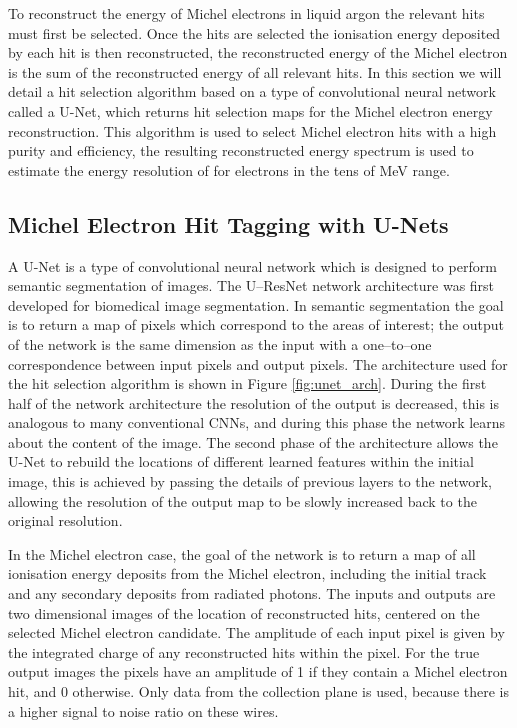 To reconstruct the energy of Michel electrons in liquid argon the relevant hits
must first be selected. Once the hits are selected the ionisation energy
deposited by each hit is then reconstructed, the reconstructed energy of the 
Michel electron is the sum of the reconstructed energy of all relevant hits. In
this section we will detail a hit selection algorithm based on a type of
convolutional neural network called a U-Net, which returns hit selection maps 
for the Michel electron energy reconstruction. This algorithm is used to select 
Michel electron hits with a high purity and efficiency, the resulting 
reconstructed energy spectrum is used to estimate the energy resolution of 
\protodune{} for electrons in the tens of MeV range.

\subsection{Michel Electron Hit Tagging with U-Nets}

A U-Net is a type of convolutional neural network which is designed to perform
semantic segmentation of images. The U--ResNet network architecture was first 
developed for biomedical image segmentation\cite{ronneberger2015u}. In 
semantic segmentation the goal is to return a map of pixels which correspond 
to the areas of interest; the output of the network is the same dimension as 
the input with a one--to--one correspondence between input pixels and output 
pixels. The architecture used for the hit selection algorithm is shown in 
Figure \ref{fig:unet_arch}. During the first half of the network architecture 
the resolution of the output is decreased, this is analogous to many 
conventional CNNs, and during this phase the network learns about the content 
of the image. The second phase of the architecture allows the U-Net to 
rebuild the locations of different learned features within the initial image, 
this is achieved by passing the details of previous layers to the network,
allowing the resolution of the output map to be slowly increased back to the 
original resolution.

In the Michel electron case, the goal of the network is to return a map of all
ionisation energy deposits from the Michel electron, including the initial 
track and any secondary deposits from radiated photons. The inputs and outputs 
are two dimensional images of the location of reconstructed hits, centered on 
the selected Michel electron candidate. The amplitude of each input pixel is 
given by the integrated charge of any reconstructed hits within the pixel. For 
the true output images the pixels have an amplitude of 1 if they contain a 
Michel electron hit, and 0 otherwise. Only data from the collection plane is 
used, because there is a higher signal to noise ratio on these wires. 

